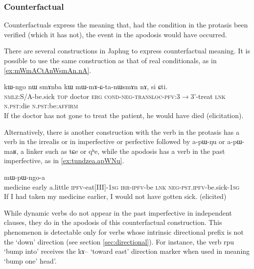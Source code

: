 \documentclass[oldfontcommands,oneside,a4paper,11pt]{article}
\newcommand{\ipa}[1]{{\phon \mbox{#1}}} %
\begin{document}
\subsubsection{Counterfactual} \label{sec:counterfact}
Counterfactuals express the meaning that, had the condition in the protasis been verified (which it has not), the event in the apodosis would have occurred.

There are several constructions in Japhug to express counterfactual meaning. It is possible to use the same construction as that of real conditionals, as    in \ref{ex:mWmACtAnWsmAn.nA}.
     \begin{exe}
   \ex \label{ex:mWmACtAnWsmAn.nA}
   \gll
\ipa{kɯ-ngo}  	\ipa{nɯ}  	\ipa{smɤnba}  	\ipa{kɯ}  	\ipa{mɯ-mɤ-ɕ-ta-nɯsmɤn}  	\ipa{nɤ,}  	\ipa{si}  	\ipa{ɕti.}  \\
\textsc{nmlz}:S/A-be.sick \textsc{top} doctor \textsc{erg} \textsc{cond-neg-transloc-pfv}:3$\rightarrow$3'-treat \textsc{lnk} \textsc{n.pst}:die \textsc{n.pst}:be:\textsc{affirm} \\
\glt If the doctor has not gone to treat the patient, he would have died (elicitation).
\end{exe}

Alternatively, there is another construction with the verb in the protasis has a verb  in the  irrealis or in imperfective or perfective followed by \ipa{a-pɯ-ŋu} or \ipa{a-pɯ-maʁ}, a linker such as \ipa{tɕe} or \ipa{qʰe}, while the apodosis has a verb in the past imperfective, as in \ref{ex:tundzea.apWNu}.

     \begin{exe}
   \ex \label{ex:tundzea.apWNu}
   \gll
[\ipa{smɤn}   	\ipa{ʑa} \ipa{tsa}   	\ipa{tu-ndze-a}   	\textbf{\ipa{a-pɯ-ŋu}}]   	\ipa{tɕe}   	\ipa{mɯ-pɯ-ngo-a}   \\
medicine early  a.little \textsc{ipfv}-eat[III]-\textsc{1sg} \textsc{irr-ipfv}-be \textsc{lnk} \textsc{neg-pst.ipfv}-be.sick-\textsc{1sg} \\
\glt If I had taken my medicine earlier, I would not have gotten sick. (elicited)
\end{exe}

While dynamic verbs do not appear in the past imperfective in independent clauses, they do in the apodosis of this counterfactual construction. This phenomenon is   detectable only for   verbs whose intrinsic directional prefix is not the `down' direction (see section \ref{sec:directional}). For instance, the verb \ipa{rpu} `bump into' receives the \ipa{kɤ}-- `toward east' direction marker when used in meaning `bump one' head'.
\end{document}
